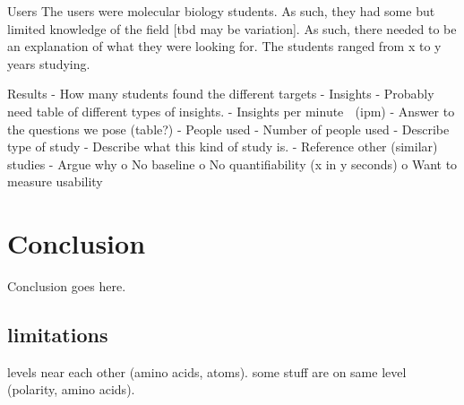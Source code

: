 \documentclass[review,journal]{vgtc}         %
\begin{document}
Users
The users were molecular biology students. As such, they had some but limited knowledge of the field [tbd may be variation]. 
As such, there needed to be an explanation of what they were looking for. The students ranged from x to y years studying.

Results
-	How many students found the different targets
-	Insights
-	Probably need table of different types of insights.
-	Insights per minute  (ipm)
-	Answer to the questions we pose (table?)
-	People used
-	Number of people used
-	Describe type of study
-	Describe what this kind of study is.
-	Reference other (similar) studies
-	Argue why 
o	No baseline
o	No quantifiability (x in y seconds)
o	Want to measure usability


\section{Conclusion}

Conclusion goes here.

\subsection{limitations}
levels near each other (amino acids, atoms).
some stuff are on same level (polarity, amino acids).





\end{document}
